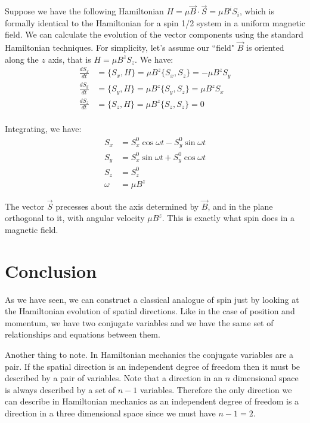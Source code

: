 \documentclass[aps,pra,10pt,floatfix,nofootinbib]{revtex4-1}
\theoremstyle{definition}
\begin{document}
Suppose we have the following Hamiltonian $H=\mu\vec{B}\cdot\vec{S}=\mu B^i S_i$, which is formally identical to the Hamiltonian for a spin 1/2 system in a uniform magnetic field. We can calculate the evolution of the vector components using the standard Hamiltonian techniques. For simplicity, let's assume our ``field" $\vec{B}$ is oriented along the $z$ axis, that is $H= \mu B^z S_z$. We have:
\begin{equation}
\begin{aligned}
\frac{dS_x}{dt} &= \{S_x, H\} = \mu B^z \{S_x, S_z\} = - \mu B^z S_y \\
\frac{dS_y}{dt} &= \{S_y, H\} = \mu B^z \{S_y, S_z\} = \mu B^z S_x \\
\frac{dS_z}{dt} &= \{S_z, H\} = \mu B^z \{S_z, S_z\} = 0 \\
\end{aligned}
\label{SpinEquations}
\end{equation}

Integrating, we have:
\begin{equation}
\begin{aligned}
S_x &= S^0_x \cos \omega t - S^0_y \sin \omega t \\
S_y &= S^0_x \sin \omega t + S^0_y \cos \omega t \\
S_z &= S^0_z \\
\omega &= \mu B^z
\end{aligned}
\label{SpinPrecession}
\end{equation}

The vector $\vec{S}$ precesses about the axis determined by $\vec{B}$, and in the plane orthogonal to it, with angular velocity $\mu B^z$. This is exactly what spin does in a magnetic field.

\section{Conclusion}

As we have seen, we can construct a classical analogue of spin just by looking at the Hamiltonian evolution of spatial directions. Like in the case of position and momentum, we have two conjugate variables and we have the same set of relationships and equations between them.

Another thing to note. In Hamiltonian mechanics the conjugate variables are a pair. If the spatial direction is an independent degree of freedom then it must be described by a pair of variables. Note that a direction in an $n$ dimensional space is always described by a set of $n-1$ variables. Therefore the only direction we can describe in Hamiltonian mechanics as an independent degree of freedom is a direction in a three dimensional space since we must have $n-1 = 2$.
\end{document}
